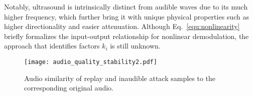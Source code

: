 Notably, ultrasound is intrinsically distinct from audible waves due to its much higher frequency, which further bring it with unique physical properties such as higher directionality and easier attenuation. %
Although Eq.~\ref{equ:nonlinearity} briefly formalizes the input-output relationship for nonlinear demodulation, the approach that identifies factors $k_i$ is still unknown. %

\begin{figure}[t]
    \texttt{[image: audio\_quality\_stability2.pdf]}
    \caption{\label{fig:audio_quality_stability}Audio similarity of replay and inaudible attack samples to the corresponding original audio.}
\end{figure}
\fi
